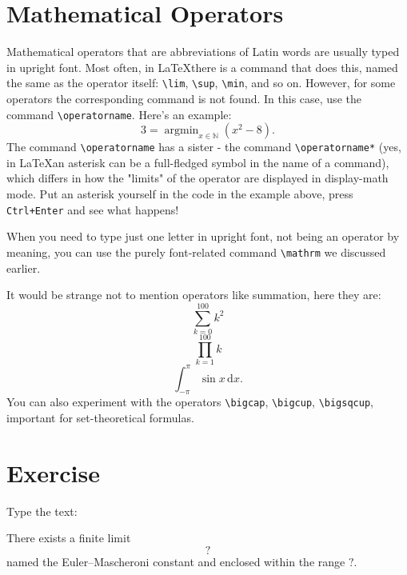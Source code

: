 \section{Mathematical Operators}
\par Mathematical operators that are abbreviations of Latin words are usually typed in upright font. Most often, in \LaTeX there is a command that does this, named the same as the operator itself: \verb"\lim", \verb"\sup", \verb"\min", and so on. However, for some operators the corresponding command is not found. In this case, use the command \verb"\operatorname".\index{\operatorname} Here's an example: \[3=\operatorname{argmin}_{x\in\mathbb{N}}(x^2-8).\] The command \verb"\operatorname" has a sister - the command \verb"\operatorname*" (yes, in \LaTeX an asterisk can be a full-fledged symbol in the name of a command), which differs in how the "limits" of the operator are displayed in display-math mode. Put an asterisk yourself in the code in the example above, press \verb"Ctrl+Enter" and see what happens!
\par When you need to type just one letter in upright font, not being an operator by meaning, you can use the purely font-related command \verb"\mathrm" we discussed earlier.\index{\mathrm}
\par It would be strange not to mention operators like summation, here they are:
\[\sum_{k=0}^{100} k^2\]
\[\prod_{k=1}^{100} k\]
\[\int_{-\pi}^\pi\sin x\,\mathrm{d}x.\]
You can also experiment with the operators \verb"\bigcap", \verb"\bigcup", \verb"\bigsqcup", important for set-theoretical formulas.

\section{Exercise}
\begin{staticpart}
Type the text: 
\end{staticpart}
\par There exists a finite limit \[?\] named the Euler–Mascheroni constant and enclosed within the range \(?\).

